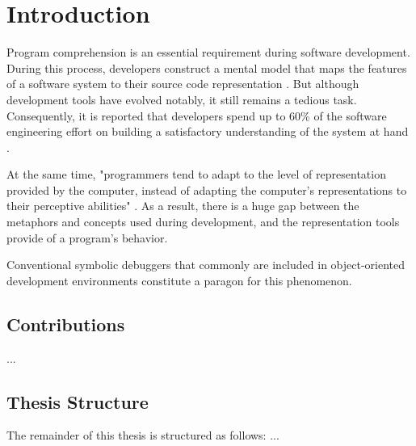 \chapter{Introduction}
\label{c:introduction}

Program comprehension is an essential requirement during software development.
During this process, developers construct a mental model that maps the features of a software system to their source code representation \cite{latoza_maintaining_2006}.
But although development tools have evolved notably, it still remains a tedious task.
Consequently, it is reported that developers spend up to 60\% of the software engineering effort on building a satisfactory understanding of the system at hand \cite{corbi_program_1989, basili_evolving_1997, ducasse_class_2005, rothlisberger_feature_2007, cornelissen_execution_2008}.

At the same time, "programmers tend to adapt to the level of representation
provided by the computer, instead of adapting the computer's representations
to their perceptive abilities" \cite{diehl_software_2007}.
As a result, there is a huge gap between the metaphors and concepts used during development, and the representation tools provide of a program's behavior.

Conventional symbolic debuggers that commonly are included in object-oriented development environments constitute a paragon for this phenomenon.


\section{Contributions}
\label{s:contributions}

\begin{description}[leftmargin=0pt]
\item[First Contribution]
...
\end{description}



\section{Thesis Structure}
\label{s:structure}

The remainder of this thesis is structured as follows:
...

% 
% 